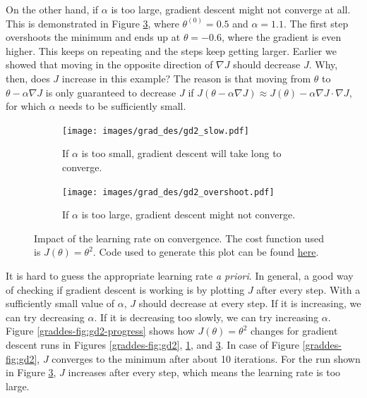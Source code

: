 \documentclass{article}
\theoremstyle{definition}
\begin{document}
On the other hand, if $\alpha$ is too large, gradient descent might not converge at all. This is demonstrated in Figure \ref{graddes-fig:gd2-overshoot}, where $\theta^{(0)}=0.5$ and $\alpha = 1.1$. The first step overshoots the minimum and ends up at $\theta=-0.6$, where the gradient is even higher. This keeps on repeating and the steps keep getting larger. Earlier we showed that moving in the opposite direction of $\nabla J$ should decrease $J$. Why, then, does $J$ increase in this example? The reason is that moving from $\theta$ to $\theta-\alpha\nabla J$ is only guaranteed to decrease $J$ if $J(\theta-\alpha\nabla J) \approx J(\theta) - \alpha\nabla J\cdot \nabla J$, for which $\alpha$ needs to be sufficiently small.

\begin{figure}[ht]
    \begin{subfigure}[ht]{\linewidth}
        \centering
        \texttt{[image: images/grad\_des/gd2\_slow.pdf]}
        \caption{If $\alpha$ is too small, gradient descent will take long to converge.}
        \label{graddes-fig:gd2-slow}
    \end{subfigure}%
    
    \begin{subfigure}[ht]{\linewidth}
        \centering
        \texttt{[image: images/grad\_des/gd2\_overshoot.pdf]}
        \caption{If $\alpha$ is too large, gradient descent might not converge.}
        \label{graddes-fig:gd2-overshoot}
    \end{subfigure}%
    
    \caption{Impact of the learning rate on convergence. The cost function used is $J(\theta)=\theta^2$. Code used to generate this plot can be found \href{https://github.com/siavashaslanbeigi/ml_notes/blob/master/src/grad_des/basics.ipynb}{\color{blue} here}.}
\end{figure}

It is hard to guess the appropriate learning rate \textit{a priori}. In general, a good way of checking if gradient descent is working is by plotting $J$ after every step.
With a sufficiently small value of $\alpha$, $J$ should decrease at every step. If it is increasing, we can try decreasing $\alpha$. If it is decreasing too slowly, we can try increasing $\alpha$.
Figure \ref{graddes-fig:gd2-progress} shows how $J(\theta)=\theta^2$ changes for gradient descent runs in Figures \ref{graddes-fig:gd2}, \ref{graddes-fig:gd2-slow}, and \ref{graddes-fig:gd2-overshoot}. In case of Figure \ref{graddes-fig:gd2}, $J$ converges to the minimum after about 10 iterations. For the run shown in Figure \ref{graddes-fig:gd2-overshoot}, $J$ increases after every step, which means the learning rate is too large.
\end{document}
